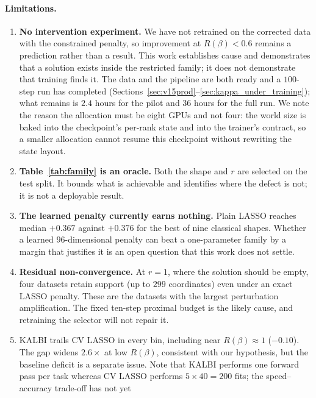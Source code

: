 \documentclass[11pt]{article}
\newcommand{\Rq}{R(\beta)}
\begin{document}
\paragraph{Limitations.}
\begin{enumerate}
\itemsep2pt
\item \textbf{No intervention experiment.} We have not retrained on the
      corrected data with the constrained penalty, so improvement at
      $\Rq < 0.6$ remains a prediction rather than a result. This work
      establishes cause and demonstrates that a solution exists inside the
      restricted family; it does not demonstrate that training finds it.
      The data and the pipeline are both ready and a $100$-step run has
      completed (Sections~\ref{sec:v15prod}--\ref{sec:kappa_under_training});
      what remains is $2.4$ hours for the pilot and $36$ hours for the full
      run. We note the reason the allocation must be eight GPUs and not four:
      the world size is baked into the checkpoint's per-rank state and into
      the trainer's contract, so a smaller allocation cannot resume this
      checkpoint without rewriting the state layout.
\item \textbf{Table~\ref{tab:family} is an oracle.} Both the shape and $r$ are
      selected on the test split. It bounds what is achievable and identifies
      where the defect is not; it is not a deployable result.
\item \textbf{The learned penalty currently earns nothing.} Plain LASSO reaches
      median $+0.367$ against $+0.376$ for the best of nine classical shapes.
      Whether a learned $96$-dimensional penalty can beat a one-parameter
      family by a margin that justifies it is an open question that this work
      does not settle.
\item \textbf{Residual non-convergence.} At $r = 1$, where the solution should
      be empty, four datasets retain support (up to $299$ coordinates) even
      under an exact LASSO penalty. These are the datasets with the largest
      perturbation amplification. The fixed ten-step proximal budget is the
      likely cause, and retraining the selector will not repair it.
\item KALBI trails CV LASSO in every bin, including near $\Rq \approx 1$
      ($-0.10$). The gap widens $2.6\times$ at low $\Rq$, consistent with our
      hypothesis, but the baseline deficit is a separate issue. Note that
      KALBI performs one forward pass per task whereas CV LASSO performs
      $5 \times 40 = 200$ fits; the speed--accuracy trade-off has not yet

\end{enumerate}
\end{document}
